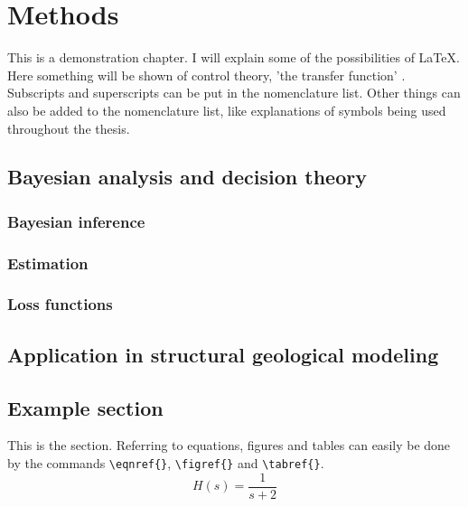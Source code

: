     \chapter{Methods}

    This is a demonstration chapter. I will explain some of the possibilities of \LaTeX. Here something will be shown of control theory, 'the transfer function' . Subscripts and superscripts can be put in the nomenclature  list.   Other things can also be added to the nomenclature list, like explanations of symbols being used throughout the thesis.  

        \section{Bayesian analysis and decision theory}
        
        \subsection{Bayesian inference}
        
        \subsection{Estimation}
        
        \subsection{Loss functions} 
        
        \section{Application in structural geological modeling}          

        \section{Example section}

        This is the section. Referring to equations, figures and tables can easily be done by the commands \verb"\eqnref{}",
        \verb"\figref{}" and \verb"\tabref{}".
        \begin{equation}\label{eq:First}
        H(s) = \frac{1}{s+2}
        \end{equation}

